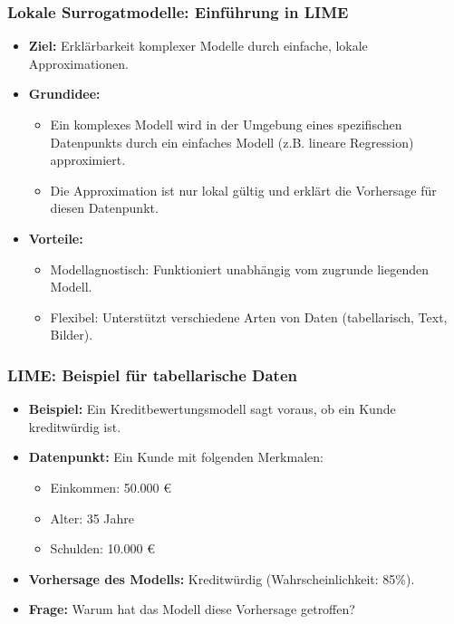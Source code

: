 \documentclass[aspectratio=1610, xcolor=dvipsnames, 9pt]{beamer}
\begin{document}
\begin{frame}
  \frametitle{Lokale Surrogatmodelle: Einführung in LIME}
  \begin{itemize}
    \item \textbf{Ziel:} Erklärbarkeit komplexer Modelle durch einfache, lokale Approximationen.
    \item \textbf{Grundidee:}
    \begin{itemize}
      \item Ein komplexes Modell wird in der Umgebung eines spezifischen Datenpunkts durch ein einfaches Modell (z.B. lineare Regression) approximiert.
      \item Die Approximation ist nur lokal gültig und erklärt die Vorhersage für diesen Datenpunkt.
    \end{itemize}
    \item \textbf{Vorteile:}
    \begin{itemize}
      \item Modellagnostisch: Funktioniert unabhängig vom zugrunde liegenden Modell.
      \item Flexibel: Unterstützt verschiedene Arten von Daten (tabellarisch, Text, Bilder).
    \end{itemize}
  \end{itemize}
\end{frame}

\begin{frame}
  \frametitle{LIME: Beispiel für tabellarische Daten}
  \begin{itemize}
    \item \textbf{Beispiel:} Ein Kreditbewertungsmodell sagt voraus, ob ein Kunde kreditwürdig ist.
    \item \textbf{Datenpunkt:} Ein Kunde mit folgenden Merkmalen:
    \begin{itemize}
      \item Einkommen: 50.000 €
      \item Alter: 35 Jahre
      \item Schulden: 10.000 €
    \end{itemize}
    \item \textbf{Vorhersage des Modells:} Kreditwürdig (Wahrscheinlichkeit: 85\%).
    \item \textbf{Frage:} Warum hat das Modell diese Vorhersage getroffen?
  \end{itemize}
\end{frame}
\end{document}

